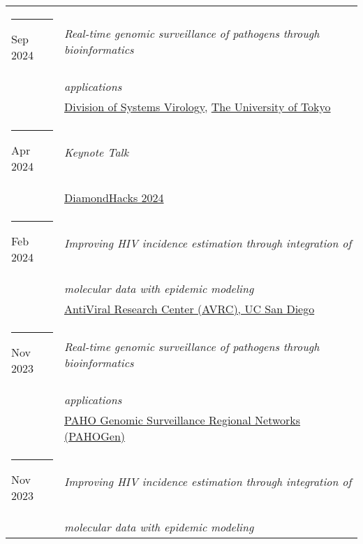 \documentclass[margin,line]{res}
\begin{document}
\begin{resume}
\begin{longtable}{@{}p{0.7in}p{4in}}
\hspace*{-4mm} \rule{-1mm}{5mm} Sep 2024 & \textit{Real-time genomic surveillance of pathogens through bioinformatics}\\*
\hspace*{-4mm} & \hspace{4mm} \textit{applications}\\*
\hspace*{-4mm} & \hspace{4mm} \href{https://www.ims.u-tokyo.ac.jp/imsut/en/lab/ggclink/section04.html}{Division of Systems Virology}, \href{https://www.u-tokyo.ac.jp/en/}{The University of Tokyo}\\
\hspace*{-4mm} \rule{-1mm}{5mm} Apr 2024 & \textit{Keynote Talk}\\*
\hspace*{-4mm} & \hspace{4mm} \href{https://diamondhacks-2024.devpost.com/}{DiamondHacks 2024}\\
\hspace*{-4mm} \rule{-1mm}{5mm} Feb 2024 & \textit{Improving HIV incidence estimation through integration of}\\*
\hspace*{-4mm} & \hspace{4mm} \textit{molecular data with epidemic modeling}\\*
\hspace*{-4mm} & \hspace{4mm} \href{https://medschool.ucsd.edu/som/medicine/research/centers/avrc/pages/default.aspx}{AntiViral Research Center (AVRC), UC San Diego}\\
\hspace*{-4mm} \rule{-1mm}{5mm} Nov 2023 & \textit{Real-time genomic surveillance of pathogens through bioinformatics}\\*
\hspace*{-4mm} & \hspace{4mm} \textit{applications}\\*
\hspace*{-4mm} & \hspace{4mm} \href{https://www.paho.org/}{PAHO Genomic Surveillance Regional Networks (PAHOGen)}\\
\hspace*{-4mm} \rule{-1mm}{5mm} Nov 2023 & \textit{Improving HIV incidence estimation through integration of}\\*
\hspace*{-4mm} & \hspace{4mm} \textit{molecular data with epidemic modeling}\\*

\end{longtable}
\end{resume}
\end{document}
